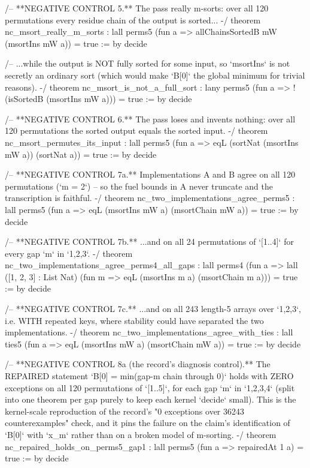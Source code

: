 \documentclass[11pt]{article}
\begin{document}
\begin{Vlean}
/-- **NEGATIVE CONTROL 5.**  The pass really m-sorts: over all 120 permutations every residue
chain of the output is sorted... -/
theorem nc_msort_really_m_sorts :
    lall perms5 (fun a => allChainsSortedB mW (msortIns mW a)) = true := by decide

/-- ...while the output is NOT fully sorted for some input, so `msortIns` is not secretly an
ordinary sort (which would make `B[0]` the global minimum for trivial reasons). -/
theorem nc_msort_is_not_a_full_sort :
    lany perms5 (fun a => !(isSortedB (msortIns mW a))) = true := by decide

/-- **NEGATIVE CONTROL 6.**  The pass loses and invents nothing: over all 120 permutations the
sorted output equals the sorted input. -/
theorem nc_msort_permutes_its_input :
    lall perms5 (fun a => eqL (sortNat (msortIns mW a)) (sortNat a)) = true := by decide

/-- **NEGATIVE CONTROL 7a.**  Implementations A and B agree on all 120 permutations
(`m = 2`) -- so the fuel bounds in A never truncate and the transcription is faithful. -/
theorem nc_two_implementations_agree_perms5 :
    lall perms5 (fun a => eqL (msortIns mW a) (msortChain mW a)) = true := by decide

/-- **NEGATIVE CONTROL 7b.**  ...and on all 24 permutations of `[1..4]` for every gap
`m` in `{1,2,3}`. -/
theorem nc_two_implementations_agree_perms4_all_gaps :
    lall perms4 (fun a =>
        lall ([1, 2, 3] : List Nat) (fun m => eqL (msortIns m a) (msortChain m a)))
      = true := by decide

/-- **NEGATIVE CONTROL 7c.**  ...and on all 243 length-5 arrays over `{1,2,3}`, i.e. WITH
repeated keys, where stability could have separated the two implementations. -/
theorem nc_two_implementations_agree_with_ties :
    lall ties5 (fun a => eqL (msortIns mW a) (msortChain mW a)) = true := by decide

/-- **NEGATIVE CONTROL 8a (the record's diagnosis control).**  The REPAIRED statement
`B[0] = min(gap-m chain through 0)` holds with ZERO exceptions on all 120 permutations of
`[1..5]`, for each gap `m` in `{1,2,3,4}` (split into one theorem per gap purely to keep each
kernel `decide` small).  This is the kernel-scale reproduction of the record's
"0 exceptions over 36243 counterexamples" check, and it pins the failure on the claim's
identification of `B[0]` with `x_m` rather than on a broken model of m-sorting. -/
theorem nc_repaired_holds_on_perms5_gap1 :
    lall perms5 (fun a => repairedAt 1 a) = true := by decide


\end{Vlean}
\end{document}
